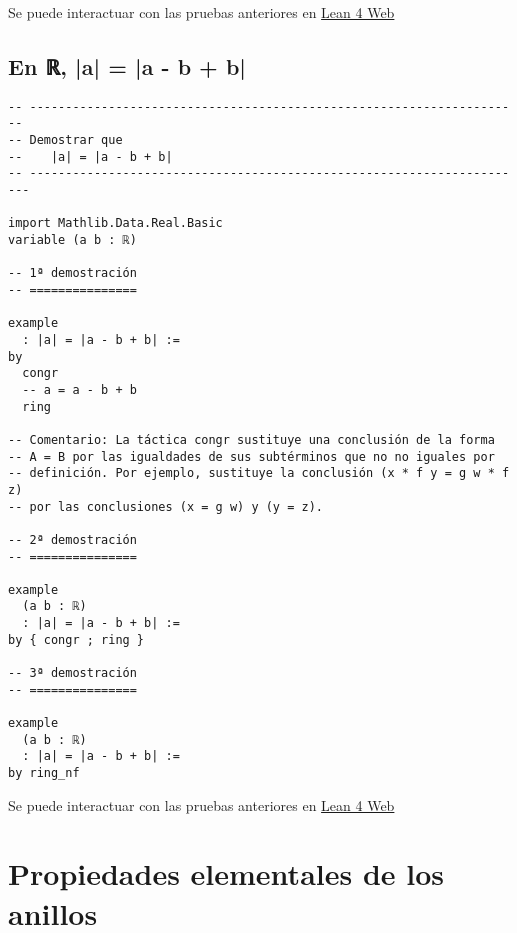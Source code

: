 Se puede interactuar con las pruebas anteriores en \href{https://lean.math.hhu.de/\#url=https://raw.githubusercontent.com/jaalonso/Calculemus2/main/src/Cuadrado\_igual\_a\_cuadrado.lean}{Lean 4 Web}

\section{En ℝ, |a| = |a - b + b|}
\label{sec:org057b0e5}
\begin{verbatim}
-- ---------------------------------------------------------------------
-- Demostrar que
--    |a| = |a - b + b|
-- ----------------------------------------------------------------------

import Mathlib.Data.Real.Basic
variable (a b : ℝ)

-- 1ª demostración
-- ===============

example
  : |a| = |a - b + b| :=
by
  congr
  -- a = a - b + b
  ring

-- Comentario: La táctica congr sustituye una conclusión de la forma
-- A = B por las igualdades de sus subtérminos que no no iguales por
-- definición. Por ejemplo, sustituye la conclusión (x * f y = g w * f z)
-- por las conclusiones (x = g w) y (y = z).

-- 2ª demostración
-- ===============

example
  (a b : ℝ)
  : |a| = |a - b + b| :=
by { congr ; ring }

-- 3ª demostración
-- ===============

example
  (a b : ℝ)
  : |a| = |a - b + b| :=
by ring_nf
\end{verbatim}
Se puede interactuar con las pruebas anteriores en \href{https://lean.math.hhu.de/\#url=https://raw.githubusercontent.com/jaalonso/Calculemus2/main/src/Demostracion\_por\_congruencia.lean}{Lean 4 Web}

\chapter{Propiedades elementales de los anillos}
\label{sec:org3a2dda9}

